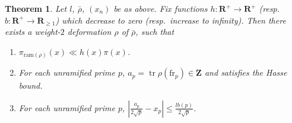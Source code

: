 \documentclass{article}
\DeclareMathOperator{\tr}{tr}
\newcommand{\bR}{\mathbf{R}}
\newcommand{\bZ}{\mathbf{Z}}
\newcommand{\frob}{\mathrm{fr}}
\newcommand{\ram}{\mathrm{ram}}
\newtheorem{theorem}{Theorem}
\begin{document}
\begin{theorem}\label{thm:master-Galois}
Let $l$, $\bar\rho$, $(x_n)$ be as above. Fix functions 
$h\colon \bR^+\to \bR^+$ (resp.~$b\colon \bR^+ \to \bR_{\geqslant 1}$) which 
decrease to zero (resp.~increase to infinity). Then there exists a weight-$2$ 
deformation $\rho$ of $\bar\rho$, such that 
\begin{enumerate}
\item
$\pi_{\ram(\rho)}(x) \ll h(x) \pi(x)$. 

\item
For each unramified prime $p$, $a_p=\tr\rho(\frob_p)\in \bZ$ and satisfies the 
Hasse bound. 

\item
For each unramified prime $p$, 
$\left| \frac{a_p}{2\sqrt p} - x_p\right| \leqslant \frac{l b(p)}{2\sqrt p}$. 
\end{enumerate}
\end{theorem}
\end{document}

